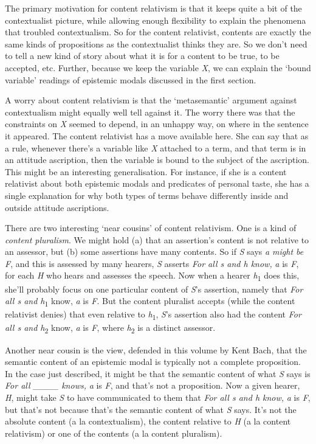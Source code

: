 \documentclass[
  11pt,
  letterpaper,
  DIV=11,
  numbers=noendperiod,
  twoside]{scrartcl}
\begin{document}
The primary motivation for content relativism is that it keeps quite a
bit of the contextualist picture, while allowing enough flexibility to
explain the phenomena that troubled contextualism. So for the content
relativist, contents are exactly the same kinds of propositions as the
contextualist thinks they are. So we don't need to tell a new kind of
story about what it is for a content to be true, to be accepted, etc.
Further, because we keep the variable \emph{X}, we can explain the
`bound variable' readings of epistemic modals discussed in the first
section.

A worry about content relativism is that the `metasemantic' argument
against contextualism might equally well tell against it. The worry
there was that the constraints on \emph{X} seemed to depend, in an
unhappy way, on where in the sentence it appeared. The content
relativist has a move available here. She can say that as a rule,
whenever there's a variable like \emph{X} attached to a term, and that
term is in an attitude ascription, then the variable is bound to the
subject of the ascription. This might be an interesting generalisation.
For instance, if she is a content relativist about both epistemic modals
and predicates of personal taste, she has a single explanation for why
both types of terms behave differently inside and outside attitude
ascriptions.

There are two interesting `near cousins' of content relativism. One is a
kind of \emph{content pluralism}. We might hold (a) that an assertion's
content is not relative to an assessor, but (b) some assertions have
many contents. So if \emph{S} says \emph{a might be F}, and this is
assessed by many hearers, \emph{S} asserts \emph{For all s and h know,}
\emph{a} is \emph{F}, for each \emph{H} who hears and assesses the
speech. Now when a hearer \emph{h}\textsubscript{1} does this, she'll
probably focus on one particular content of \emph{S}'s assertion, namely
that \emph{For all s and h}\textsubscript{1} know, \emph{a} is \emph{F}.
But the content pluralist accepts (while the content relativist denies)
that even relative to \emph{h}\textsubscript{1}, \emph{S}'s assertion
also had the content \emph{For all s and h}\textsubscript{2} know,
\emph{a} is \emph{F}, where \emph{h}\textsubscript{2} is a distinct
assessor.

Another near cousin is the view, defended in this volume by Kent Bach,
that the semantic content of an epistemic modal is typically not a
complete proposition. In the case just described, it might be that the
semantic content of what \emph{S} says is \emph{For all \_\_\_\_ knows,}
\emph{a} is \emph{F}, and that's not a proposition. Now a given hearer,
\emph{H}, might take \emph{S} to have communicated to them that
\emph{For all s and h know,} \emph{a} is \emph{F}, but that's not
because that's the semantic content of what \emph{S} says. It's not the
absolute content (a la contextualism), the content relative to \emph{H}
(a la content relativism) or one of the contents (a la content
pluralism).
\end{document}
